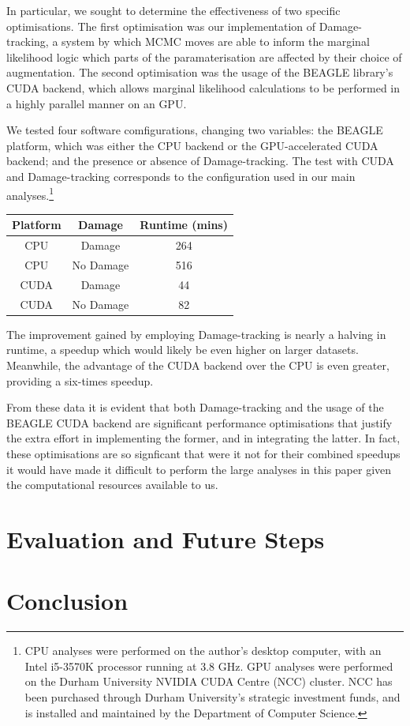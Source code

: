 \documentclass[10pt,journal,compsoc]{IEEEtran}
\begin{document}
In particular, we sought to determine the effectiveness of two specific optimisations. The first optimisation was our implementation of Damage-tracking, a system by which MCMC moves are able to inform the marginal likelihood logic which parts of the paramaterisation are affected by their choice of augmentation. The second optimisation was the usage of the BEAGLE library's CUDA backend, which allows marginal likelihood calculations to be performed in a highly parallel manner on an GPU.

We tested four software comfigurations, changing two variables: the BEAGLE platform, which was either the CPU backend or the GPU-accelerated CUDA backend; and the presence or absence of Damage-tracking. The test with CUDA and Damage-tracking corresponds to the configuration used in our main analyses.\footnote{CPU analyses were performed on the author's desktop computer, with an Intel i5-3570K processor running at 3.8 GHz. GPU analyses were performed on the Durham University NVIDIA CUDA Centre (NCC) cluster. NCC has been purchased through Durham University's strategic investment funds, and is installed and maintained by the Department of Computer Science.}

\begin{center}

\begin{tabular}{ |c|c|c| }
    \hline
    Platform & Damage & Runtime (mins) \\
    \hline
    CPU& Damage & 264 \\
    CPU& No Damage & 516 \\
    CUDA& Damage & 44 \\
    CUDA& No Damage & 82 \\
    \hline
\end{tabular}

\end{center}

The improvement gained by employing Damage-tracking is nearly a halving in runtime, a speedup which would likely be even higher on larger datasets. Meanwhile, the advantage of the CUDA backend over the CPU is even greater, providing a six-times speedup.

From these data it is evident that both Damage-tracking and the usage of the BEAGLE CUDA backend are significant performance optimisations that justify the extra effort in implementing the former, and in integrating the latter. In fact, these optimisations are so signficant that were it not for their combined speedups it would have made it difficult to perform the large analyses in this paper given the computational resources available to us.

\section{Evaluation and Future Steps}

\section{Conclusion}



\end{document}
